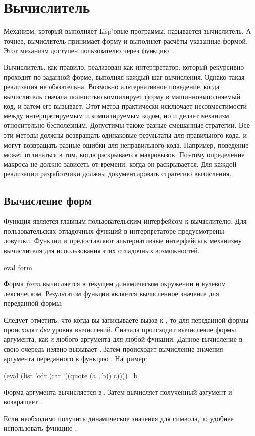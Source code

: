 \else

\chapter{Вычислитель}

Механизм, который выполняет Lisp'овые программы, называется вычислитель.
А точнее, вычислитель принимает форму и выполняет расчёты указанные формой.
Этот механизм доступен пользователю через функцию .

Вычислитель, как правило, реализован как интерпретатор, который рекурсивно
проходит по заданной форме, выполняя каждый шаг вычисления. Однако такая
реализация не обязательна. Возможно альтернативное поведение, когда вычислитель
сначала полностью компилирует форму в машинновыполняемый код, и затем его
вызывает.
Этот метод практически исключает несовместимости между интерпретируемым и
компилируемым кодом, но и делает механизм  относительно
бесполезным.
Допустимы также разные смешанные стратегии. Все эти методы должны возвращать
одинаковые результаты для правильного кода, и могут возвращать разные ошибки для
неправильного кода.
Например, поведение может отличаться в том, когда раскрывается
макровызов. Поэтому определение макроса не должно зависеть от времени, когда он
раскрывается. Для каждой реализации разработчики должны документировать
стратегию вычисления. 

\section{Вычисление форм}

Функция  является главным пользовательским интерфейсом к вычислителю.
Для пользовательских отладочных функций в интерпретаторе предусмотрены ловушки. 
Функции  и  предоставляют альтернативные интерфейсы
к механизму вычислителя для использования этих отладочных возможностей.

\begin{defun}[Функция]
eval form

Форма \emph{form} вычисляется в текущем динамическом окружении и нулевом
лексическом. Результатом функции является вычисленное значение для переданной
формы.

Следует отметить, что когда вы записываете вызов к , то для переданной
формы происходят \emph{два} уровня вычислений.
Сначала происходит вычисление формы аргумента, как и любого аргумента для любой
функции. Данное вычисление в свою очередь неявно вызывает .
Затем происходит вычисление значения аргумента переданного в функцию .
Например:
\begin{lisp}
(eval (list 'cdr (car '((quote (a . b)) c)))) \EV\ b
\end{lisp}
Форма аргумента  вычисляется в
.
Затем  вычисляет полученный аргумент и возвращает .

Если необходимо получить динамическое значения для символа, то удобнее
использовать функцию .
\end{defun}


